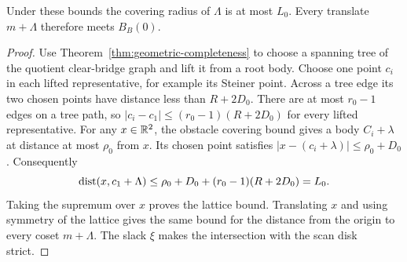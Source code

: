 \begin{lemma}
\label{lem:lattice-cover-bound}
Under these bounds the covering radius of $\Lambda$ is at most $L_0$.
Every translate $m+\Lambda$ therefore meets $B_B(0)$.
\end{lemma}
\begin{proof}
Use Theorem~\ref{thm:geometric-completeness} to choose a spanning tree
of the quotient clear-bridge graph and lift it from a root body. Choose
one point $c_i$ in each lifted representative, for example its Steiner
point. Across a tree edge its two chosen points have distance less than
$R+2D_0$. There are at most $r_0-1$ edges on a tree path, so
$|c_i-c_1|\le(r_0-1)(R+2D_0)$ for every lifted representative.
For any $x\in\mathbb R^2$, the obstacle covering bound gives a body
$C_i+\lambda$ at distance at most $\rho_0$ from $x$. Its chosen point
satisfies $|x-(c_i+\lambda)|\le\rho_0+D_0$. Consequently
\[
 \operatorname{dist}(x,c_1+\Lambda)\le
 \rho_0+D_0+(r_0-1)(R+2D_0)=L_0.
\]
Taking the supremum over $x$ proves the lattice bound. Translating $x$
and using symmetry of the lattice gives the same bound for the distance
from the origin to every coset $m+\Lambda$. The slack $\xi$ makes the
intersection with the scan disk strict.
\end{proof}

